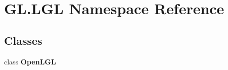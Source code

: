 \hypertarget{namespace_g_l_1_1_l_g_l}{}\section{G\+L.\+L\+GL Namespace Reference}
\label{namespace_g_l_1_1_l_g_l}
\subsection*{Classes}
\begin{DoxyCompactItemize}
\item 
class {\bfseries Open\+L\+GL}
\end{DoxyCompactItemize}
